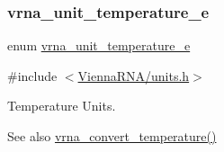 \subsubsection{\texorpdfstring{vrna\_unit\_temperature\_e}{vrna\_unit\_temperature\_e}}
{\footnotesize\ttfamily enum \mbox{\hyperlink{group__units_gadeca8d9e91ef85f1b652cc8aef63d7e4}{vrna\+\_\+unit\+\_\+temperature\+\_\+e}}}



{\ttfamily \#include $<$\mbox{\hyperlink{units_8h}{Vienna\+R\+N\+A/units.\+h}}$>$}



Temperature Units. 

\begin{DoxySeeAlso}{See also}
\mbox{\hyperlink{group__units_gaf1bb1db32eba33b9f306214f5955d0c2}{vrna\+\_\+convert\+\_\+temperature()}} 
\end{DoxySeeAlso}
